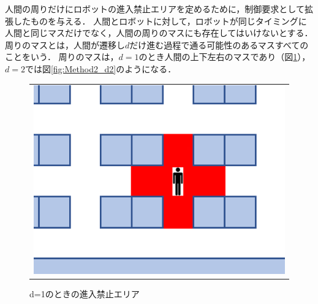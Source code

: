 人間の周りだけにロボットの進入禁止エリアを定めるために，制御要求として拡張したものを与える．
人間とロボットに対して，ロボットが同じタイミングに人間と同じマスだけでなく，人間の周りのマスにも存在してはいけないとする．周りのマスとは，人間が遷移し$d$だけ進む過程で通る可能性のあるマスすべてのことをいう．
周りのマスは，$d=1$のとき人間の上下左右のマスであり（図\ref{fig:Method2_d1}），$d=2$では図\ref{fig:Method2_d2}のようになる．

\begin{figure}[htbp]
  \begin{center}
    \begin{tabular}{c}

      \begin{minipage}{0.5\hsize}
        \begin{center}
          \includegraphics[scale=0.3]{figures/Method2_d1.pdf}
          \caption{d=1のときの進入禁止エリア}%
          \label{fig:Method2_d1}
        \end{center}
      \end{minipage}


\end{tabular}
\end{center}
\end{figure}
